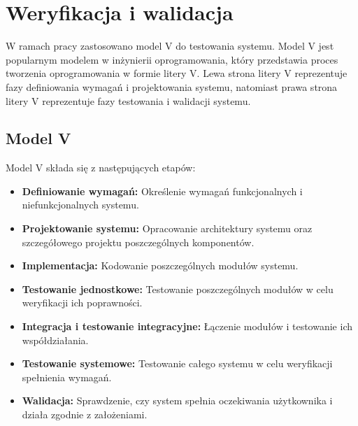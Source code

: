 \documentclass[a4paper,twoside,12pt]{book}
\begin{document}
\chapter{Weryfikacja i walidacja}
W ramach pracy zastosowano model V do testowania systemu. Model V jest popularnym modelem w inżynierii oprogramowania, który przedstawia proces tworzenia oprogramowania w formie litery V. Lewa strona litery V reprezentuje fazy definiowania wymagań i projektowania systemu, natomiast prawa strona litery V reprezentuje fazy testowania i walidacji systemu. 

\section{Model V}
Model V składa się z następujących etapów:
\begin{itemize}
	\item \textbf{Definiowanie wymagań:} Określenie wymagań funkcjonalnych i niefunkcjonalnych systemu.
	\item \textbf{Projektowanie systemu:} Opracowanie architektury systemu oraz szczegółowego projektu poszczególnych komponentów.
	\item \textbf{Implementacja:} Kodowanie poszczególnych modułów systemu.
	\item \textbf{Testowanie jednostkowe:} Testowanie poszczególnych modułów w celu weryfikacji ich poprawności.
	\item \textbf{Integracja i testowanie integracyjne:} Łączenie modułów i testowanie ich współdziałania.
	\item \textbf{Testowanie systemowe:} Testowanie całego systemu w celu weryfikacji spełnienia wymagań.
	\item \textbf{Walidacja:} Sprawdzenie, czy system spełnia oczekiwania użytkownika i działa zgodnie z założeniami.
\end{itemize}
\end{document}
